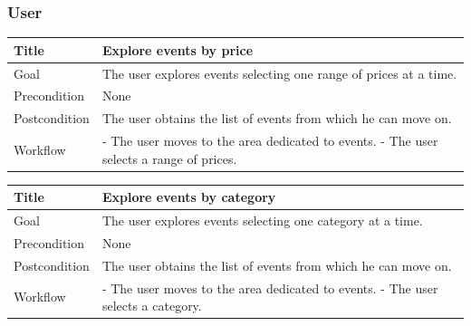 \documentclass{beamer}
\begin{document}
\begin{frame}
    \frametitle{User}
    \begin{table}
        \tiny
        \begin{tabular}{|p{2cm}|p{6cm}|}
        \hline
        Title & \textbf{Explore events by price} \\
        \hline
        Goal & The user explores events selecting one range of prices at a time. \\
        \hline
        Precondition & None \\
        \hline
        Postcondition & The user obtains the list of events from which he can move on.\\
        \hline
        Workflow &
        - The user moves to the area dedicated to events. \newline
        - The user selects a range of prices. \\
        \hline
        \end{tabular}
\end{table}

\begin{table}
    \tiny
    \begin{tabular}{|p{2cm}|p{6cm}|}
    \hline
    Title & \textbf{Explore events by category} \\
    \hline
    Goal & The user explores events selecting one category at a time. \\
    \hline
    Precondition & None \\
    \hline
    Postcondition & The user obtains the list of events from which he can move on.\\
    \hline
    Workflow &
    - The user moves to the area dedicated to events. \newline
    - The user selects a category. \\
    \hline
    \end{tabular}
\end{table}
\end{frame}


\end{document}
